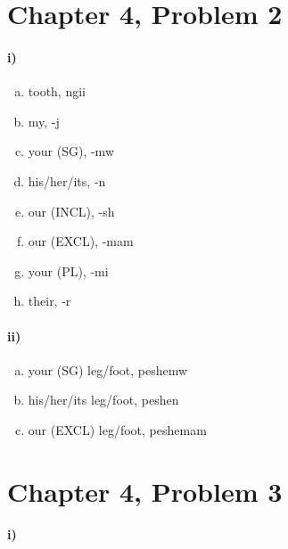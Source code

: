 \documentclass[12pt]{article}
\begin{document}
\section*{Chapter 4, Problem 2}

\paragraph{i)}

\begin{multicols}{2}
    \begin{enumerate}[a)]
        \item tooth, ngii
        \item my, -j
        \item your (SG), -mw
        \item his/her/its, -n
        \item our (INCL), -sh
        \item our (EXCL), -mam
        \item your (PL), -mi
        \item their, -r
    \end{enumerate}
\end{multicols}

\paragraph{ii)}

\begin{multicols}{2}
    \begin{enumerate}[a)]
        \item your (SG) leg/foot, peshemw
        \item his/her/its leg/foot, peshen
        \item our (EXCL) leg/foot, peshemam
    \end{enumerate}
\end{multicols}

\section*{Chapter 4, Problem 3}

\paragraph{i)}
\end{document}
